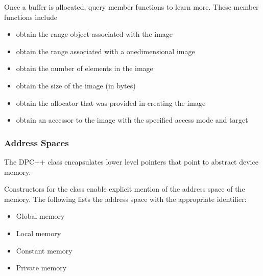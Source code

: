 \documentclass[letterpaper,10pt,english]{sphinxmanual}
\begin{document}
Once a buffer is allocated, query member functions to learn more. These
member functions include
\begin{itemize}
\item {} 
 \textendash{} obtain the range object associated with the image

\item {} 
 \sphinxhyphen{} obtain the range associated with a one\sphinxhyphen{}dimensional
image

\item {} 
 \textendash{} obtain the number of elements in the image

\item {} 
 \textendash{} obtain the size of the image (in bytes)

\item {} 
 \textendash{} obtain the allocator that was provided in
creating the image

\item {} 
 \textendash{} obtain an accessor to the image with the specified
access mode and target

\end{itemize}


\subsubsection{Address Spaces}
\label{\detokenize{programming-interface/data/multi-pointer:address-spaces}}\label{\detokenize{programming-interface/data/multi-pointer:multi-pointer}}\label{\detokenize{programming-interface/data/multi-pointer::doc}}
The DPC++  class encapsulates lower level pointers that
point to abstract device memory.

Constructors for the  class enable explicit mention of
the address space of the memory. The following lists the address space
with the appropriate identifier:
\begin{itemize}
\item {} 
Global memory \textendash{} 

\item {} 
Local memory \textendash{} 

\item {} 
Constant memory \textendash{} 

\item {} 
Private memory \textendash{} 

\end{itemize}
\end{document}
